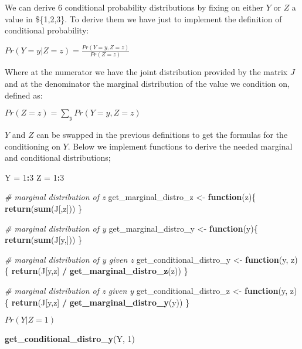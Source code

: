 \documentclass[
]{article}
\newenvironment{Shaded}{\begin{snugshade}}{\end{snugshade}}
\newcommand{\CommentTok}[1]{\textcolor[rgb]{0.56,0.35,0.01}{\textit{#1}}}
\newcommand{\ControlFlowTok}[1]{\textcolor[rgb]{0.13,0.29,0.53}{\textbf{#1}}}
\newcommand{\DecValTok}[1]{\textcolor[rgb]{0.00,0.00,0.81}{#1}}
\newcommand{\FunctionTok}[1]{\textcolor[rgb]{0.13,0.29,0.53}{\textbf{#1}}}
\newcommand{\NormalTok}[1]{#1}
\newcommand{\OtherTok}[1]{\textcolor[rgb]{0.56,0.35,0.01}{#1}}
\newcommand{\SpecialCharTok}[1]{\textcolor[rgb]{0.81,0.36,0.00}{\textbf{#1}}}
\begin{document}
We can derive 6 conditional probability distributions by fixing on
either \(Y\) or \(Z\) a value in \$\{1,2,3\}. To derive them we have
just to implement the definition of conditional probability:

\(Pr(Y = y | Z = z) = \frac{Pr(Y = y, Z = z)}{Pr(Z = z)}\)

Where at the numerator we have the joint distribution provided by the
matrix \(J\) and at the denominator the marginal distribution of the
value we condition on, defined as:

\(Pr(Z = z) = \sum_yPr(Y = y, Z = z)\)

\(Y\) and \(Z\) can be swapped in the previous definitions to get the
formulas for the conditioning on \(Y\). Below we implement functions to
derive the needed marginal and conditional distributions;

\begin{Shaded}
\begin{Highlighting}[]
\NormalTok{Y }\OtherTok{=} \DecValTok{1}\SpecialCharTok{:}\DecValTok{3}
\NormalTok{Z }\OtherTok{=} \DecValTok{1}\SpecialCharTok{:}\DecValTok{3}

\CommentTok{\# marginal distribution of z}
\NormalTok{get\_marginal\_distro\_z }\OtherTok{\textless{}{-}} \ControlFlowTok{function}\NormalTok{(z)\{}
  \FunctionTok{return}\NormalTok{(}\FunctionTok{sum}\NormalTok{(J[,z]))}
\NormalTok{\}}

\CommentTok{\# marginal distribution of y}
\NormalTok{get\_marginal\_distro\_y }\OtherTok{\textless{}{-}} \ControlFlowTok{function}\NormalTok{(y)\{}
  \FunctionTok{return}\NormalTok{(}\FunctionTok{sum}\NormalTok{(J[y,]))}
\NormalTok{\}}

\CommentTok{\# marginal distribution of y given z}
\NormalTok{get\_conditional\_distro\_y }\OtherTok{\textless{}{-}} \ControlFlowTok{function}\NormalTok{(y, z)\{}
  \FunctionTok{return}\NormalTok{(J[y,z] }\SpecialCharTok{/} \FunctionTok{get\_marginal\_distro\_z}\NormalTok{(z))}
\NormalTok{\}}

\CommentTok{\# marginal distribution of z given y}
\NormalTok{get\_conditional\_distro\_z }\OtherTok{\textless{}{-}} \ControlFlowTok{function}\NormalTok{(y, z)\{}
  \FunctionTok{return}\NormalTok{(J[y,z] }\SpecialCharTok{/} \FunctionTok{get\_marginal\_distro\_y}\NormalTok{(y))}
\NormalTok{\}}
\end{Highlighting}
\end{Shaded}

\(Pr(Y | Z=1)\)

\begin{Shaded}
\begin{Highlighting}[]
\FunctionTok{get\_conditional\_distro\_y}\NormalTok{(Y, }\DecValTok{1}\NormalTok{)}
\end{Highlighting}
\end{Shaded}
\end{document}
